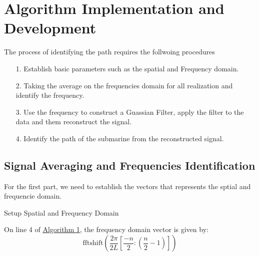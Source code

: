 \documentclass{article}
\begin{document}
\section{Algorithm Implementation and Development}
The process of identifying the path requires the follwoing procedures
\begin{enumerate}
    \item[1.] Establish basic parameters such as the spatial and Frequency domain.
    \item[2.] Taking the average on the frequencies domain for all realization and identify the frequency. 
    \item[3.] Use the frequency to construct a Guassian Filter, apply the filter to the data and them reconstruct the signal. 
    \item[4.] Identify the path of the submarine from the reconstructed signal. 
\end{enumerate}

\newpage
\subsection{Signal Averaging and Frequencies Identification}
    For the first part, we need to establish the vectors that represents the sptial and frequencie domain.
    \begin{algorithm}\label{alg:setup}\small
        \begin{algorithmic}[1]
        \end{algorithmic}\caption{Setup Spatial and Frequency Domain}
    \end{algorithm}
    On line 4 of \hyperref[alg:setup]{Algorithm 1}, the frequency domain vector is given by: 
    \begin{equation}
        \text{fftshift}\left(
            \frac{2\pi}{2L}
            \left[
                \frac{-n}{2}:\left(\frac{n}{2} - 1\right)
            \right]
            \right)
    \end{equation}
\end{document}
